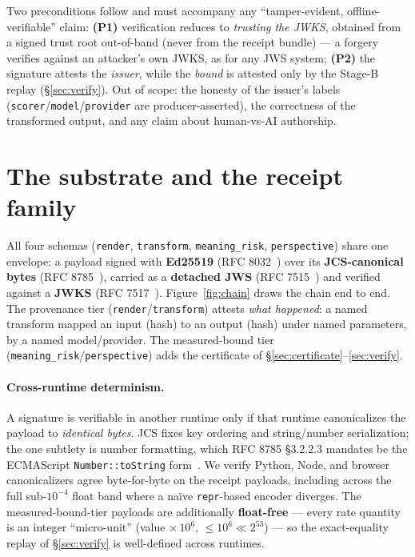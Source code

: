 \documentclass[11pt]{article}
\theoremstyle{definition}
\begin{document}
Two preconditions follow and must accompany any ``tamper-evident,
offline-verifiable'' claim: \textbf{(P1)} verification reduces to
\emph{trusting the JWKS}, obtained from a signed trust root out-of-band
(never from the receipt bundle) --- a forgery verifies against an attacker's
own JWKS, as for any JWS system; \textbf{(P2)} the signature attests the
\emph{issuer}, while the \emph{bound} is attested only by the
Stage-B replay (\S\ref{sec:verify}). Out of scope: the honesty of the
issuer's labels (\texttt{scorer}/\texttt{model}/\texttt{provider} are
producer-asserted), the correctness of the transformed output, and any claim
about human-vs-AI authorship.

\section{The substrate and the receipt family}\label{sec:substrate}

All four schemas (\texttt{render}, \texttt{transform},
\texttt{meaning\_risk}, \texttt{perspective}) share one envelope: a payload
signed with \textbf{Ed25519} (RFC 8032~\cite{rfc8032}) over its
\textbf{JCS-canonical bytes} (RFC 8785~\cite{rfc8785}), carried as a
\textbf{detached JWS} (RFC 7515~\cite{rfc7515}) and verified against a
\textbf{JWKS} (RFC 7517~\cite{rfc7517}). Figure~\ref{fig:chain} draws the chain end to end. The provenance tier
(\texttt{render}/\texttt{transform}) attests \emph{what happened}: a named
transform mapped an input (hash) to an output (hash) under named parameters,
by a named model/provider. The measured-bound tier
(\texttt{meaning\_risk}/\texttt{perspective}) adds the certificate of
\S\ref{sec:certificate}--\ref{sec:verify}.

\paragraph{Cross-runtime determinism.}
A signature is verifiable in another runtime only if that runtime
canonicalizes the payload to \emph{identical bytes}. JCS fixes key ordering
and string/number serialization; the one subtlety is number formatting,
which RFC 8785 \S3.2.2.3 mandates be the ECMAScript
\texttt{Number::toString} form~\cite{ecma262}. We verify Python, Node, and
browser canonicalizers agree byte-for-byte on the receipt payloads,
including across the full sub-$10^{-4}$ float band where a na\"ive
\texttt{repr}-based encoder diverges. The measured-bound-tier payloads are
additionally \textbf{float-free} --- every rate quantity is an integer
``micro-unit'' (value $\times\, 10^{6}$, $\le 10^{6} \ll 2^{53}$) --- so the
exact-equality replay of \S\ref{sec:verify} is well-defined across runtimes.
\end{document}
